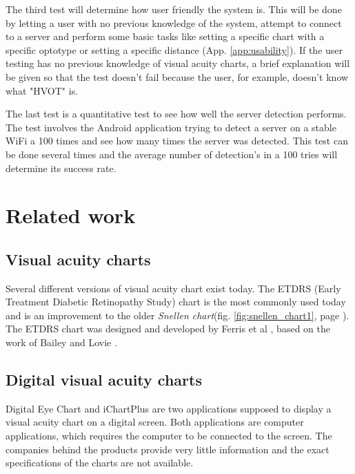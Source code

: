 \documentclass[12pt,a4paper,notitlepage]{report}
\begin{document}
The third test will determine how user friendly the system is. This will be done by letting a user with no previous knowledge of the system, attempt to connect to a server and perform some basic tasks like setting a specific chart with a specific optotype or setting a specific distance (App. \ref{app:usability}). If the user testing has no previous knowledge of visual acuity charts, a brief explanation will be given so that the test doesn't fail because the user, for example, doesn't know what "HVOT" is.

The last test is a quantitative test to see how well the server detection performs. The test involves the Android application trying to detect a server on a stable WiFi a 100 times and see how many times the server was detected. This test can be done several times and the average number of detection's in a 100 tries will determine its success rate.

\section{Related work}

\subsection{Visual acuity charts}
Several different versions of visual acuity chart exist today. The ETDRS (Early Treatment Diabetic Retinopathy Study) chart is the most commonly used today and is an improvement to the older \textit{Snellen chart}(fig. \ref{fig:snellen_chart1}, page \pageref{fig:snellen_chart1}). The ETDRS chart was designed and developed by Ferris et al \cite{Ferris}, based on the work of Bailey and Lovie \cite{Bailey}. 



\subsection{Digital visual acuity charts}
Digital Eye Chart \cite{digitaleyechart} and iChartPlus \cite{ichartplus} are two applications supposed to display a visual acuity chart on a digital screen. Both applications are computer applications, which requires the computer to be connected to the screen. The companies behind the products provide very little information and the exact specifications of the charts are not available.
\end{document}
